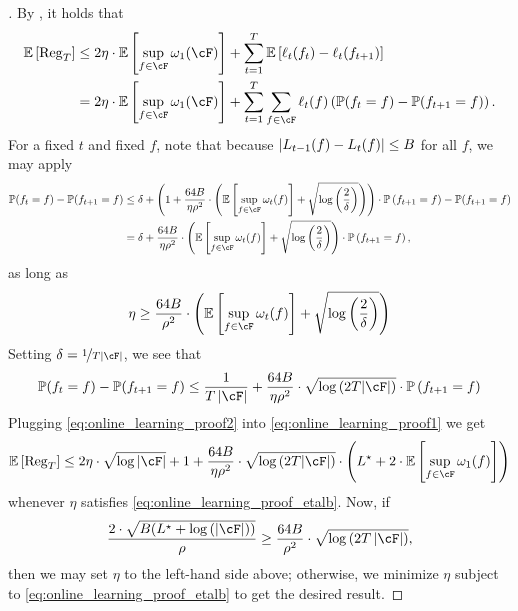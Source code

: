 \begin{proof}[]
    By , it holds that
    \begin{align}
        \ee\left[ \reg_T \right] &\leq 2 \eta \cdot \ee\left[ \sup_{f \in \cF} \omega_1(\cF) \right] + \sum_{t = 1}^T \ee\left[ \ell_t(f_t) - \ell_t(f_{t+1}) \right] \\
        &= 2 \eta \cdot \ee\left[ \sup_{f \in \cF} \omega_1(\cF) \right] + \sum_{t = 1}^T \sum_{f \in \cF} \ell_t(f)  \left( \pp(f_t = f) - \pp(f_{t+1} = f) \right). \label{eq:online_learning_proof1}
    \end{align}
    For a fixed $t$ and fixed $f$, note that because $\left|L_{t-1}(f) - L_t(f)\right| \leq B$ for all $f$, we may apply 
    \begin{align}
        \pp(f_t = f) - \pp(f_{t+1} = f) &\leq  \delta + \left(1 + \frac{64 B }{ \eta   \rho^2}  \cdot\left( \ee\left[ \sup_{f \in \cF} \omega_t(f) \right] + \sqrt{\log\left( \frac 2\delta \right)}\right)\right) \cdot \pp\left( f_{t+1} = f \right) - \pp(f_{t+1} = f) \\
        &= \delta + \frac{64 B }{ \eta  \rho^2}  \cdot\left( \ee\left[ \sup_{f \in \cF} \omega_t(f) \right] + \sqrt{\log\left( \frac 2\delta \right)}\right) \cdot \pp\left( f_{t+1} = f \right),
    \end{align}
    as long as
    \begin{align}\label{eq:online_learning_proof_etalb}
        \eta \geq \frac{64 B }{   \rho^2}  \cdot\left( \ee\left[ \sup_{f \in \cF} \omega_t(f) \right] + \sqrt{\log\left( \frac 2\delta \right)}\right)
    \end{align}
    Setting $\delta = \nicefrac{1}{T \abs{\cF}}$, we see that
    \begin{align}\label{eq:online_learning_proof2}
        \pp(f_t = f) - \pp(f_{t+1} = f) \leq \frac{1}{T \abs{\cF}} + \frac{64 B}{\eta\rho^2} \cdot\sqrt{\log\left( 2 T |\cF| \right)} \cdot \pp\left( f_{t+1} = f \right)
    \end{align}
    Plugging \eqref{eq:online_learning_proof2} into \eqref{eq:online_learning_proof1} we get
    \begin{align}
        \ee\left[ \reg_T \right] \leq 2 \eta \cdot \sqrt{\log \abs{\cF}} + 1 + \frac{64 B}{\eta  \rho^2} \cdot\sqrt{\log\left( 2 T |\cF| \right)} \cdot \left( \Lstar + 2 \cdot \ee\left[ \sup_{f \in \cF} \omega_1(f) \right] \right)
    \end{align}
    whenever $\eta$ satisfies \eqref{eq:online_learning_proof_etalb}.  Now, if
    \begin{align}
        \frac{2 \cdot \sqrt{B (\Lstar + \log\left( \abs{\cF} \right))}}{\rho} \geq \frac{64 B }{   \rho^2}  \cdot\sqrt{\log\left(  2T \abs{\cF} \right)},
    \end{align}
    then we may set $\eta$ to the left-hand side above; otherwise, we minimize $\eta$ subject to \eqref{eq:online_learning_proof_etalb} to get the desired result.
\end{proof}


